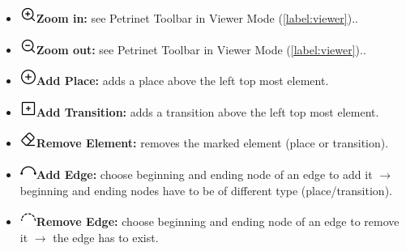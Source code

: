 \documentclass[10pt, a4paper]{article}
\begin{document}
\begin{itemize}
\item\includegraphics[scale=0.4]{../src/resources/images/Toolbar/zoom-in.png}\hspace{0.1cm}\textbf{Zoom in:} see Petrinet Toolbar in Viewer Mode (\ref{label:viewer})..
\item\includegraphics[scale=0.4]{../src/resources/images/Toolbar/zoom-out.png}\hspace{0.1cm}\textbf{Zoom out:} see Petrinet Toolbar in Viewer Mode (\ref{label:viewer})..
\item\includegraphics[scale=0.4]{../src/resources/images/Toolbar/add-circle.png}\hspace{0.1cm}\textbf{Add Place:} adds a place above the left top most element.
\item\includegraphics[scale=0.4]{../src/resources/images/Toolbar/add-square.png}\hspace{0.1cm}\textbf{Add Transition:} adds a transition above the left top most element.
\item\includegraphics[scale=0.4]{../src/resources/images/Toolbar/erase.png}\hspace{0.1cm}\textbf{Remove Element:} removes the marked element (place or transition).
\item\includegraphics[scale=0.4]{../src/resources/images/Toolbar/arc.png}\hspace{0.1cm}\textbf{Add Edge:} choose beginning and ending node of an edge to add it $\rightarrow$ beginning and ending nodes have to be of different type (place/transition).
\item\includegraphics[scale=0.4]{../src/resources/images/Toolbar/remove-edge.png}\hspace{0.1cm}\textbf{Remove Edge:} choose beginning and ending node of an edge to remove it $\rightarrow$ the edge has to exist.

\end{itemize}
\end{document}
